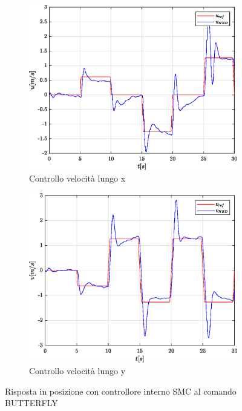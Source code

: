 \begin{figure}
\begin{subfigure}{0.45\textwidth}
		\label{fig:BUTTERFLYerrposySMC}
	\end{subfigure}
	\\
	\begin{subfigure}{0.45\textwidth}
		\centering
		\includegraphics[width=1\textwidth]{Simulazioni/Figure/SMC/BUTTERFLY/PositionControlXVel}
		\caption{Controllo velocità lungo x}
		\label{fig:BUTTERFLYerrvelxSMC}
	\end{subfigure}
	\hfill
	\begin{subfigure}{0.45\textwidth}
		\centering
		\includegraphics[width=1\textwidth]{Simulazioni/Figure/SMC/BUTTERFLY/PositionControlYVel}
		\caption{Controllo velocità lungo y}
		\label{fig:BUTTERFLYerrvelySMC}
	\end{subfigure}
	\caption{Risposta in posizione con controllore interno SMC al comando BUTTERFLY}
\end{figure}

